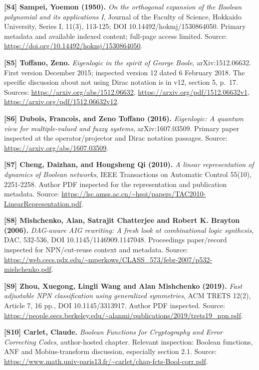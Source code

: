 \documentclass[
  10pt,
]{article}
\begin{document}
\textbf{{[}S4{]} Sampei, Yoemon (1950).} \emph{On the orthogonal
expansion of the Boolean polynomial and its applications I}, Journal of
the Faculty of Science, Hokkaido University, Series I, 11(3), 113-125;
DOI 10.14492/hokmj/1530864050. Primary metadata and available indexed
content; full-page access limited. Source:
\url{https://doi.org/10.14492/hokmj/1530864050}.

\textbf{{[}S5{]} Toffano, Zeno.} \emph{Eigenlogic in the spirit of
George Boole}, arXiv:1512.06632. First version December 2015; inspected
version 12 dated 6 February 2018. The specific discussion about not
using Dirac notation is in v12, section 5, p.~17. Sources:
\url{https://arxiv.org/abs/1512.06632},
\url{https://arxiv.org/pdf/1512.06632v1},
\url{https://arxiv.org/pdf/1512.06632v12}.

\textbf{{[}S6{]} Dubois, Francois, and Zeno Toffano (2016).}
\emph{Eigenlogic: A quantum view for multiple-valued and fuzzy systems},
arXiv:1607.03509. Primary paper inspected at the operator/projector and
Dirac notation passages. Source: \url{https://arxiv.org/abs/1607.03509}.

\textbf{{[}S7{]} Cheng, Daizhan, and Hongsheng Qi (2010).} \emph{A
linear representation of dynamics of Boolean networks}, IEEE
Transactions on Automatic Control 55(10), 2251-2258. Author PDF
inspected for the representation and publication metadata. Source:
\url{https://lsc.amss.ac.cn/~hsqi/papers/TAC2010-LinearRepresentation.pdf}.

\textbf{{[}S8{]} Mishchenko, Alan, Satrajit Chatterjee and Robert K.
Brayton (2006).} \emph{DAG-aware AIG rewriting: A fresh look at
combinational logic synthesis}, DAC, 532-536, DOI
10.1145/1146909.1147048. Proceedings paper/record inspected for
NPN/cut-reuse context and metadata. Source:
\url{https://web.cecs.pdx.edu/~mperkows/CLASS_573/febr-2007/p532-mishchenko.pdf}.

\textbf{{[}S9{]} Zhou, Xuegong, Lingli Wang and Alan Mishchenko (2019).}
\emph{Fast adjustable NPN classification using generalized symmetries},
ACM TRETS 12(2), Article 7, 16 pp., DOI 10.1145/3313917. Author PDF
inspected. Source:
\url{https://people.eecs.berkeley.edu/~alanmi/publications/2019/trets19_npn.pdf}.

\textbf{{[}S10{]} Carlet, Claude.} \emph{Boolean Functions for
Cryptography and Error Correcting Codes}, author-hosted chapter.
Relevant inspection: Boolean functions, ANF and Mobius-transform
discussion, especially section 2.1. Source:
\url{https://www.math.univ-paris13.fr/~carlet/chap-fcts-Bool-corr.pdf}.
\end{document}
